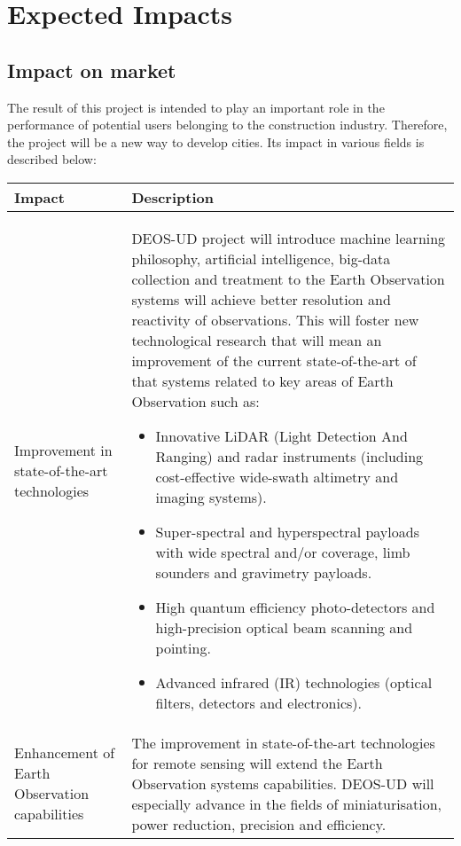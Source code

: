 \section{Expected Impacts}

\subsection{Impact on market}

The result of this project is intended to play an important role in the performance of potential users belonging to the construction industry. Therefore, the project will be a new way to develop cities. Its impact in various fields is described below:

\begin{longtable}{p{3cm} p{11cm}}
		
		\toprule[2pt]
		
		\textbf{Impact} &  \textbf{Description}\\
		
		\midrule [1.5pt]
Improvement in state-of-the-art technologies & DEOS-UD project will introduce machine learning philosophy, artificial intelligence, big-data collection and treatment to the Earth Observation systems will achieve better resolution and reactivity of observations. This will foster new technological research that will mean an improvement of the current state-of-the-art of that systems related to key areas of Earth Observation such as: 
		\begin{itemize}  
			\item Innovative LiDAR (Light Detection And Ranging) and radar instruments (including cost-effective wide-swath altimetry and imaging systems).
			\item Super-spectral and hyperspectral payloads with wide spectral and/or coverage, limb sounders and gravimetry payloads.
			\item High quantum efficiency photo-detectors and high-precision optical beam scanning and pointing.
			\item Advanced infrared (IR) technologies (optical filters, detectors and electronics).
		\end{itemize}
	\vspace{0.2cm}\\
		
		\midrule
		
		Enhancement of Earth Observation capabilities & The improvement in state-of-the-art technologies for remote sensing will extend the Earth Observation systems capabilities. DEOS-UD will especially advance in the fields of miniaturisation, power reduction, precision and efficiency.\vspace{0.2cm}\\
		

\end{longtable}

